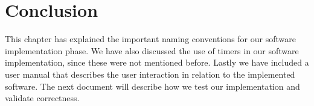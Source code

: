 \documentclass[a4paper,oneside,11pt]{article}
\begin{document}
\section{Conclusion}
This chapter has explained the important naming conventions for our software implementation phase. We have also discussed the use of timers in our software implementation, since these were not mentioned before. Lastly we have included a user manual that describes the user interaction in relation to the implemented software. The next document will describe how we test our implementation and validate correctness.
\end{document}
